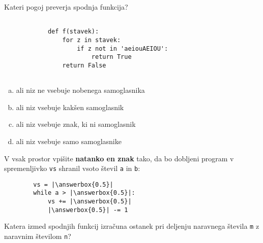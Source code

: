 \documentclass[arhiv, 10pt]{../izpit}
\newcommand{\inlinepy}[1]{\texttt{#1}}
\newcommand{\answerbox}[1]{\framebox{\vphantom{\large M}\hspace{#1cm}}}
\begin{document}
        \naloga*

        \begin{multicols}{2}
        \noindent
        Kateri pogoj preverja spodnja funkcija?
        \begin{verbatim}
        
            def f(stavek):
                for z in stavek:
                    if z not in 'aeiouAEIOU':
                        return True
                return False
            
        \end{verbatim}

        \begin{enumerate}[(a)]
\item ali niz ne vsebuje nobenega samoglasnika
\item ali niz vsebuje kakšen samoglasnik
\item ali niz vsebuje znak, ki ni samoglasnik
\item ali niz vsebuje samo samoglasnike
\end{enumerate}

        \end{multicols}
    
        \naloga*
        \begin{multicols}{2}
        \noindent
        V vsak prostor vpišite \textbf{natanko en znak} tako, da bo dobljeni program v spremenljivko \inlinepy{vs} shranil vsoto števil \inlinepy{a} in \inlinepy{b}:
        
        \columnbreak
        \begin{verbatim}
        vs = |\answerbox{0.5}|
        while a > |\answerbox{0.5}|:
            vs += |\answerbox{0.5}|
            |\answerbox{0.5}| -= 1
        \end{verbatim}
        \end{multicols}
    
        \clearpage
        \naloga
        
        Katera izmed spodnjih funkcij izračuna ostanek pri deljenju naravnega števila \inlinepy{m} z naravnim številom \inlinepy{n}?
    
\end{document}
